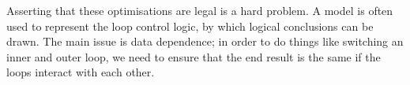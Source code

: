 Asserting that these optimisations are legal is a hard problem. A
model is often used to represent the loop control logic, by which
logical conclusions can be drawn. The main issue is data dependence;
in order to do things like switching an inner and outer loop, we need
to ensure that the end result is the same if the loops interact with
each other.

